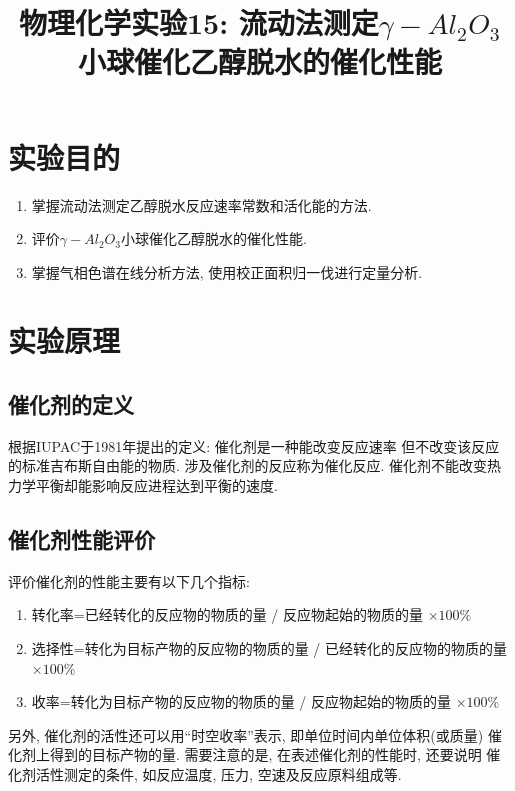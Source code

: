 \documentclass[a4paper]{article}
\title{物理化学实验15: 流动法测定$\gamma-Al_2O_3$小球催化乙醇脱水的催化性能}
\begin{document}
\maketitle
\section{实验目的}
\begin{enumerate}
\item 掌握流动法测定乙醇脱水反应速率常数和活化能的方法.
\item 评价$\gamma - Al_{2}O_{3}$小球催化乙醇脱水的催化性能.
\item 掌握气相色谱在线分析方法, 使用校正面积归一伐进行定量分析.
\end{enumerate}


\section{实验原理}
\subsection{催化剂的定义}
根据IUPAC于1981年提出的定义: 催化剂是一种能改变反应速率
但不改变该反应的标准吉布斯自由能的物质. 涉及催化剂的反应称为催化反应. 
催化剂不能改变热力学平衡却能影响反应进程达到平衡的速度.
\subsection{催化剂性能评价}
评价催化剂的性能主要有以下几个指标:
\begin{enumerate}
\item 转化率=已经转化的反应物的物质的量 / 反应物起始的物质的量 $\times 100\%$
\item 选择性=转化为目标产物的反应物的物质的量 / 已经转化的反应物的物质的量 $\times 100\%$
\item 收率=转化为目标产物的反应物的物质的量 / 反应物起始的物质的量 $\times 100\%$
\end{enumerate}
\par
另外, 催化剂的活性还可以用``时空收率''表示, 即单位时间内单位体积(或质量)
催化剂上得到的目标产物的量. 需要注意的是, 在表述催化剂的性能时, 还要说明
催化剂活性测定的条件, 如反应温度, 压力, 空速及反应原料组成等.
\end{document}
